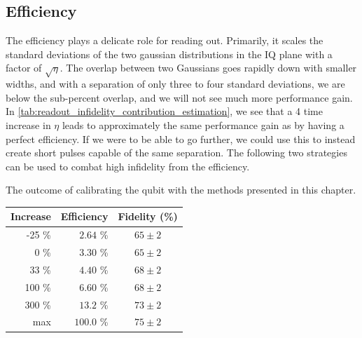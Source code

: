 \subsection{Efficiency}
The efficiency plays a delicate role for reading out. Primarily, it scales the standard deviations of the two gaussian distributions in the IQ plane with a factor of $\sqrt{\eta}$. The overlap between two Gaussians goes rapidly down with smaller widths, and with a separation of only three to four standard deviations, we are below the sub-percent overlap, and we will not see much more performance gain. In \ref{tab:readout_infidelity_contribution_estimation}, we see that a 4 time increase in $\eta$ leads to approximately the same performance gain as by having a perfect efficiency. If we were to be able to go further, we could use this to instead create short pulses capable of the same separation. The following two strategies can be used to combat high infidelity from the efficiency.


\begin{margintable}
\centering
\caption{The outcome of calibrating the qubit with the methods presented in this chapter.}
\begin{tabular}{rr|c}
\hline
\textbf{Increase}       &  Efficiency       & Fidelity (\%)\\ \hline
-25 \%                  &  $\;2.64$ \%        &  $65 \pm 2$\\
0   \%                  &  $\;3.30$ \%        &  $65 \pm 2$\\
33  \%                  &  $\;4.40$ \%        &  $68 \pm 2$\\
100  \%                 &  $\;6.60$ \%        &  $68 \pm 2$\\
300  \%                 &  $13.2$ \%          &  $73 \pm 2$\\
max                     &  $100.0$ \%         &  $75 \pm 2$\\
\end{tabular}
\label{tab:readout_infidelity_contribution_estimation}
\end{margintable}

